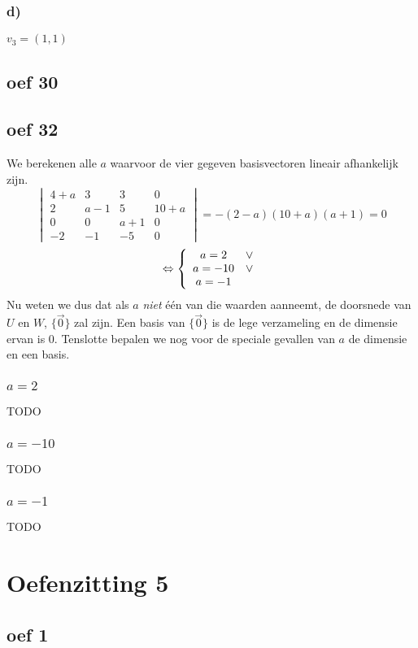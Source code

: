 \documentclass[lineaire_algebra_oplossingen.tex]{subfiles}
\begin{document}
\subsubsection*{d)}
$v_3 = (1,1)$

\subsection{oef 30}

\subsection{oef 32}
We berekenen alle $a$ waarvoor de vier gegeven basisvectoren lineair afhankelijk zijn.
\[
\begin{vmatrix}
4+a & 3 & 3 & 0\\
2 & a-1 & 5 & 10+a\\
0 & 0 & a+1 & 0\\
-2 & -1 & -5 & 0
\end{vmatrix}
= -(2-a)(10+a)(a+1)=0
\]
\[
\Leftrightarrow 
\left\lbrace
\begin{array}{c c}
a = 2 &\vee\\
a = -10 &\vee\\
a = -1\\
\end{array}
\right.
\]
Nu weten we dus dat als $a$ \textit{niet} \'e\'en van die waarden aanneemt, de doorsnede van $U$ en $W$, $\{\vec{0}\}$ zal zijn. Een basis van $\{\vec{0}\}$ is de lege verzameling en de dimensie ervan is $0$.
Tenslotte bepalen we nog voor de speciale gevallen van $a$ de dimensie en een basis.
\subsubsection*{$a = 2$}
TODO
\subsubsection*{$a=-10$}
TODO
\subsubsection*{$a=-1$}
TODO

\section{Oefenzitting 5}
\subsection{oef 1}
\end{document}
